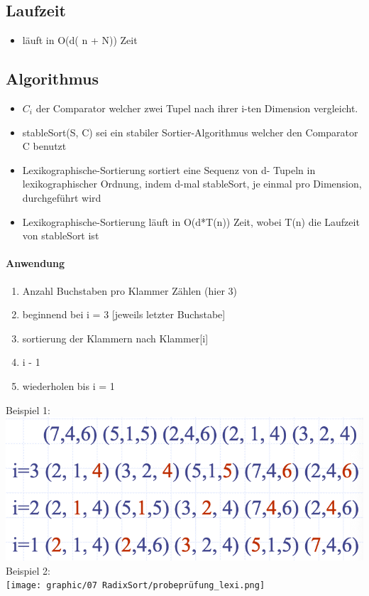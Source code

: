 \subsection{Laufzeit}
\begin{itemize}
    \item läuft in O(d( n + N)) Zeit
\end{itemize}

\subsection{Algorithmus}
\begin{itemize}
    \item $C_i$ der Comparator welcher zwei Tupel nach ihrer i-ten Dimension vergleicht.
    \item stableSort(S, C) sei ein stabiler Sortier-Algorithmus welcher den Comparator C benutzt
    \item Lexikographische-Sortierung sortiert eine Sequenz von d- Tupeln in lexikographischer Ordnung, indem d-mal stableSort, je einmal pro Dimension, durchgeführt wird
    \item Lexikographische-Sortierung läuft in O(d*T(n)) Zeit, wobei T(n) die Laufzeit von stableSort ist
\end{itemize}


\paragraph{Anwendung}
\begin{enumerate}
    \item Anzahl Buchstaben pro Klammer Zählen (hier 3)
    \item beginnend bei i = 3 [jeweils letzter Buchstabe]
    \item sortierung der Klammern nach Klammer[i]
    \item i - 1
    \item wiederholen bis i = 1
\end{enumerate}
\begin{center}
    Beispiel 1:\\
    \includegraphics[scale=.3]{graphic/07 RadixSort/lexi.png}\\
    \vspace{6pt}
    Beispiel 2:\\
    \texttt{[image: graphic/07 RadixSort/probeprüfung\_lexi.png]}
\end{center}


